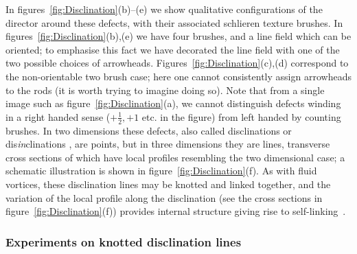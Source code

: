 In figures~\ref{fig:Disclination}(b)--(e) we show qualitative configurations of the director around these defects, with their associated schlieren texture brushes. In figures~\ref{fig:Disclination}(b),(e) we have four brushes, and a line field which can be oriented; to emphasise this fact we have decorated the line field with one of the two possible choices of arrowheads. Figures~\ref{fig:Disclination}(c),(d) correspond to the non-orientable two brush case; here one cannot consistently assign arrowheads to the rods (it is worth trying to imagine doing so). Note that from a single image such as figure~\ref{fig:Disclination}(a), we cannot distinguish defects winding in a right handed sense ($+\frac{1}{2}, +1$ etc. in the figure) from left handed by counting brushes. In two dimensions these defects, also called disclinations or dis\emph{in}clinations \citep{Frank1958}, are points, but in three dimensions they are lines, transverse cross sections of which have local profiles resembling the two dimensional case; a schematic illustration is shown in figure~\ref{fig:Disclination}(f). As with fluid vortices, these disclination lines may be knotted and linked together, and the variation of the local profile along the disclination (see the cross sections in figure~\ref{fig:Disclination}(f)) provides internal structure giving rise to self-linking~\citep{Copar2011}.

\subsubsection{Experiments on knotted disclination lines}


